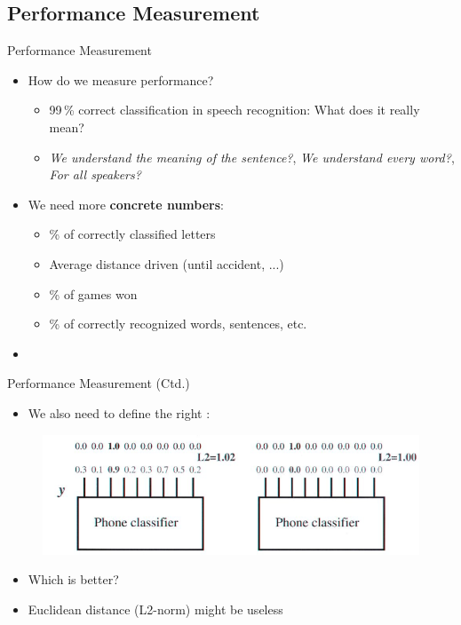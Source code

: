 \subsection{Performance Measurement}

\begin{frame}{Performance Measurement}{}
	\begin{itemize}
		\item How do we measure performance?
		\begin{itemize}
			\item 99\,\% correct classification in speech recognition: What does it really mean?
			\item \textit{We understand the meaning of the sentence?}, \textit{We understand every word?},
				\textit{For all speakers?}
		\end{itemize}
		\item We need more \textbf{concrete numbers}:
		\begin{itemize}
			\item \% of correctly classified letters
			\item Average distance driven (until accident, ...)
			\item \% of games won
			\item \% of correctly recognized words, sentences, etc.
		\end{itemize}
		\item {}
	\end{itemize}
\end{frame}


\begin{frame}{Performance Measurement (Ctd.)}{}
	\begin{itemize}
		\item We also need to define the right :
	\end{itemize}
	\begin{figure}
		\centering
		\includegraphics[scale=0.5]{01_intro_ml/02_img/error_metric}
	\end{figure}
	\vspace*{-4mm}
	\begin{itemize}
		\item Which is better?
		\item Euclidean distance (L2-norm) might be useless
	\end{itemize}
\end{frame}



